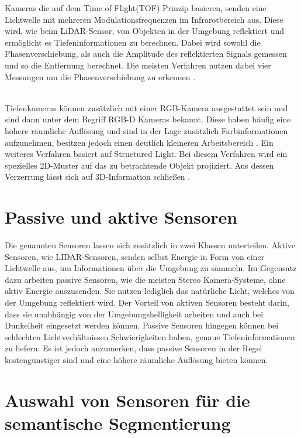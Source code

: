 Kameras die auf dem Time of Flight(TOF) Prinzip basieren, senden eine
Lichtwelle mit mehreren Modulationsfrequenzen im Infrarotbereich aus. Diese
wird, wie beim LiDAR-Sensor, von Objekten in der Umgebung reflektiert und
ermöglicht es Tiefeninformationen zu berechnen. Dabei wird sowohl die
Phasenverschiebung, als auch die Amplitude des reflektierten Signals gemessen
und so die Entfernung berechnet. Die meisten Verfahren nutzen dabei vier
Messungen um die Phasenverschiebung zu erkennen \cite{7035807,7025195}.

\\Tiefenkameras können zusätzlich mit einer RGB-Kamera ausgestattet sein und sind dann unter
dem Begriff RGB-D Kameras bekannt. Diese haben häufig eine höhere räumliche
Auflösung und sind in der Lage zusätzlich Farbinformationen aufzunehmen,
besitzen jedoch einen deutlich kleineren Arbeitsbereich \cite{9262651}. Ein
weiteres Verfahren basiert auf Structured Light. Bei diesem Verfahren wird ein
spezielles 2D-Muster auf das zu betrachtende Objekt projiziert. Aus dessen
Verzerrung lässt sich auf 3D-Information schließen \cite{7992709}.

\section{Passive und aktive Sensoren}
Die genannten Sensoren lassen sich zusätzlich in zwei Klassen unterteilen.
Aktive Sensoren, wie LIDAR-Sensoren, senden selbst Energie in Form von einer
Lichtwelle aus, um Informationen über die Umgebung zu sammeln. Im Gegensatz
dazu arbeiten passive Sensoren, wie die meisten Stereo Kamera-Systeme, ohne
aktiv Energie auszusenden. Sie nutzen lediglich das natürliche Licht, welches
von der Umgebung reflektiert wird. Der Vorteil von aktiven Sensoren besteht
darin, dass sie unabhängig von der Umgebungshelligkeit arbeiten und auch bei
Dunkelheit eingesetzt werden können. Passive Sensoren hingegen können bei
schlechten Lichtverhältnissen Schwierigkeiten haben, genaue Tiefeninformationen
zu liefern. Es ist jedoch anzumerken, dass passive Sensoren in der Regel
kostengünstiger sind und eine höhere räumliche Auflösung bieten können.
\cite{20222324}

\section{Auswahl von Sensoren für die semantische Segmentierung}

